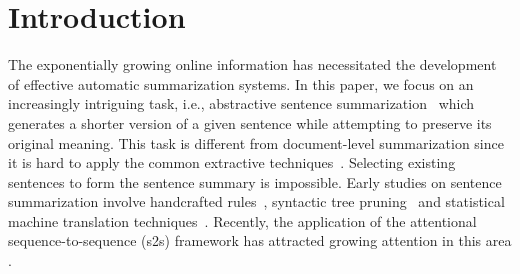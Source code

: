 \documentclass[letterpaper]{article} %
\begin{document}
	\section{Introduction}
	The exponentially growing online information has necessitated the development of effective automatic summarization systems.
In this paper, we focus on an increasingly intriguing task, i.e., abstractive sentence summarization~\cite{rush2015neural} which generates a shorter version of a given sentence while attempting to preserve its original meaning. 
This task is different from document-level summarization since it is hard to apply the common extractive techniques~\cite{over2001introduction}.
Selecting existing sentences to form the sentence summary is impossible.
Early studies on sentence summarization involve handcrafted rules~\cite{zajic2007multi}, syntactic tree pruning~\cite{knight2002summarization} and statistical machine translation techniques~\cite{banko2000headline}. 
Recently, the application of the attentional sequence-to-sequence (s2s) framework has attracted growing attention in this area \cite{rush2015neural,chopra2016abstractive,nallapati2016abstractive}.
\end{document}
